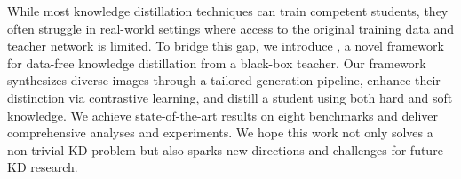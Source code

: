 While most knowledge distillation techniques can train competent students, they often struggle in real-world settings where access to the original training data and teacher network is limited.
To bridge this gap, we introduce {\methodname}, a novel framework for data-free knowledge distillation from a black-box teacher.
Our framework synthesizes diverse images through a tailored generation pipeline, enhance their distinction via contrastive learning, and distill a student using both hard and soft knowledge.
We achieve state-of-the-art results on eight benchmarks and deliver comprehensive analyses and experiments.
We hope this work not only solves a non-trivial KD problem but also sparks new directions and challenges for future KD research.
